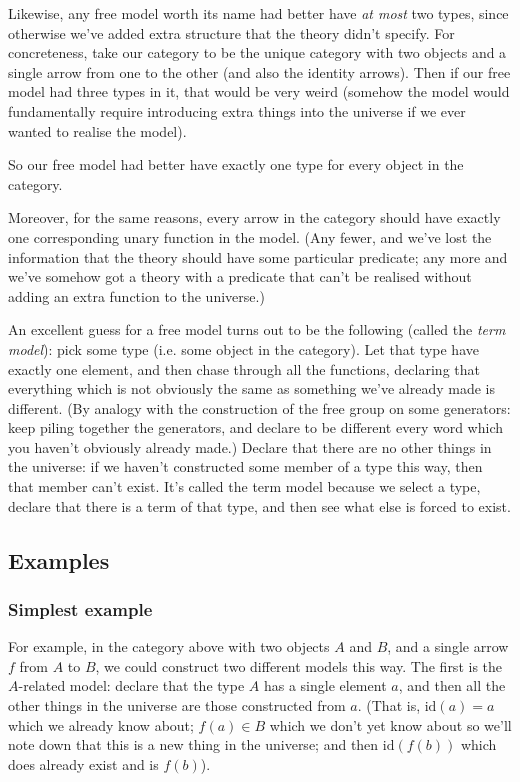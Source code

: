 \documentclass[11pt]{amsart}
\begin{document}
    Likewise, any free model worth its name had better have \emph{at most} two types, since otherwise we've added extra structure that the theory didn't specify.
    For concreteness, take our category to be the unique category with two objects and a single arrow from one to the other (and also the identity arrows).
    Then if our free model had three types in it, that would be very weird (somehow the model would fundamentally require introducing extra things into the universe if we ever wanted to realise the model).

    So our free model had better have exactly one type for every object in the category.

    Moreover, for the same reasons, every arrow in the category should have exactly one corresponding unary function in the model.
    (Any fewer, and we've lost the information that the theory should have some particular predicate; any more and we've somehow got a theory with a predicate that can't be realised without adding an extra function to the universe.)

    An excellent guess for a free model turns out to be the following (called the \emph{term model}): pick some type (i.e. some object in the category).
    Let that type have exactly one element, and then chase through all the functions, declaring that everything which is not obviously the same as something we've already made is different.
    (By analogy with the construction of the free group on some generators: keep piling together the generators, and declare to be different every word which you haven't obviously already made.)
    Declare that there are no other things in the universe: if we haven't constructed some member of a type this way, then that member can't exist.
    It's called the term model because we select a type, declare that there is a term of that type, and then see what else is forced to exist.

    \subsection{Examples}

    \subsubsection{Simplest example}

    For example, in the category above with two objects $A$ and $B$, and a single arrow $f$ from $A$ to $B$, we could construct two different models this way.
    The first is the $A$-related model: declare that the type $A$ has a single element $a$, and then all the other things in the universe are those constructed from $a$.
    (That is, $\mathrm{id}(a) = a$ which we already know about; $f(a) \in B$ which we don't yet know about so we'll note down that this is a new thing in the universe; and then $\mathrm{id}(f(b))$ which does already exist and is $f(b)$).
\end{document}
